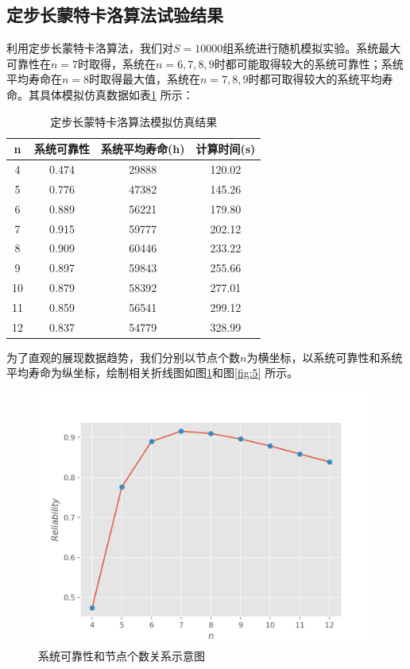\documentclass[10.5pt,twocolumn]{jbuaa}
\begin{document}
\subsection{定步长蒙特卡洛算法试验结果}
利用定步长蒙特卡洛算法，我们对$S = 10000$组系统进行随机模拟实验。系统最大可靠性在$n = 7$时取得，系统在$n = 6, 7, 8, 9$时都可能取得较大的系统可靠性；系统平均寿命在$n = 8$时取得最大值，系统在$n = 7, 8, 9$时都可取得较大的系统平均寿命。其具体模拟仿真数据如表\ref{table:1} 所示：
\begin{table}[H]
	\centering
	\label{table:1}
	\caption{定步长蒙特卡洛算法模拟仿真结果}
	\vspace{0.2cm}
	\begin{tabular}{c|c|c|c}
	\hline
	n & \kai 系统可靠性 & \kai 系统平均寿命(h) & \kai 计算时间(s) \\
	\hline
	4 & 0.474 & 29888 & 120.02\\
	\hline
	5 & 0.776 & 47382 & 145.26\\
	\hline
	6 & 0.889 & 56221 & 179.80\\
	\hline
	7 & 0.915 & 59777 & 202.12\\
	\hline
	8 & 0.909 & 60446 & 233.22\\
	\hline
	9 & 0.897 & 59843 & 255.66\\
	\hline
	10 & 0.879 & 58392 & 277.01\\
	\hline
	11 & 0.859 & 56541 & 299.12\\
	\hline
	12 & 0.837 & 54779 & 328.99\\
	\hline
		
	\end{tabular}
\end{table}

为了直观的展现数据趋势，我们分别以节点个数$n$为横坐标，以系统可靠性和系统平均寿命为纵坐标，绘制相关折线图如图\ref{fig:4}和图\ref{fig:5} 所示。
\begin{figure}[H]
	\centering
	\includegraphics[scale = 0.6]{fig4}
	\caption{系统可靠性和节点个数关系示意图}
	\label{fig:4}
\end{figure}
\end{document}
